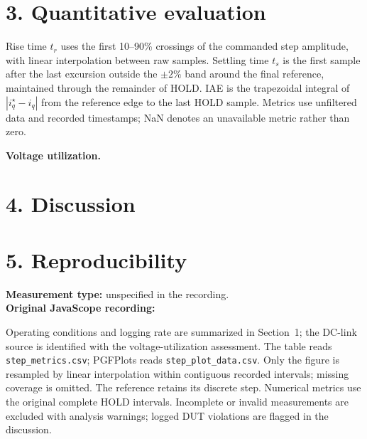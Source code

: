 \documentclass[a4paper,11pt]{article}
\begin{document}
\newpage
\section*{3. Quantitative evaluation}
\begin{center}
\end{center}

Rise time $t_r$ uses the first 10--90\% crossings of the commanded step amplitude,
with linear interpolation between raw samples. Settling time $t_s$ is the first
sample after the last excursion outside the $\pm2\%$ band around the final
reference, maintained through the remainder of HOLD. IAE is the trapezoidal
integral of $|i_q^\star-i_q|$ from the reference edge to the last HOLD sample.
Metrics use unfiltered data and recorded timestamps; NaN denotes an unavailable
metric rather than zero.

\smallskip
\textbf{Voltage utilization.}

\section*{4. Discussion}

\section*{5. Reproducibility}
\textbf{Measurement type:} unspecified in the recording.\\
\textbf{Original JavaScope recording:}

Operating conditions and logging rate are summarized in Section~1; the DC-link
source is identified with the voltage-utilization assessment. The table reads
\texttt{step\_metrics.csv}; PGFPlots reads \texttt{step\_plot\_data.csv}.
Only the figure is resampled by linear interpolation within contiguous recorded
intervals; missing coverage is omitted. The reference retains its discrete step.
Numerical metrics use the original complete HOLD intervals. Incomplete or invalid
measurements are excluded with analysis warnings; logged DUT violations are
flagged in the discussion.
\fi
\end{document}
